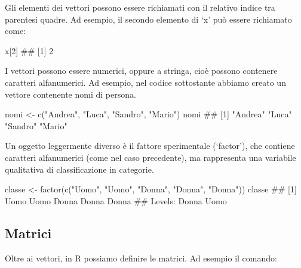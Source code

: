 \documentclass[a4paper,12pt,oneside]{book}
\newenvironment{Shaded}{\begin{snugshade}}{\end{snugshade}}
\newcommand{\DecValTok}[1]{#1}
\newcommand{\StringTok}[1]{#1}
\newcommand{\DocumentationTok}[1]{#1}
\newcommand{\OtherTok}[1]{#1}
\newcommand{\FunctionTok}[1]{#1}
\newcommand{\NormalTok}[1]{#1}
\begin{document}
Gli elementi dei vettori possono essere richiamati con il relativo indice tra parentesi quadre. Ad esempio, il secondo elemento di `x' può essere richiamato come:

\begin{Shaded}
\begin{Highlighting}[]
\NormalTok{x[}\DecValTok{2}\NormalTok{]}
\DocumentationTok{\#\# [1] 2}
\end{Highlighting}
\end{Shaded}

I vettori possono essere numerici, oppure a stringa, cioè possono contenere caratteri alfanumerici. Ad esempio, nel codice sottostante abbiamo creato un vettore contenente nomi di persona.

\begin{Shaded}
\begin{Highlighting}[]
\NormalTok{nomi }\OtherTok{\textless{}{-}} \FunctionTok{c}\NormalTok{(}\StringTok{"Andrea"}\NormalTok{, }\StringTok{"Luca"}\NormalTok{, }\StringTok{"Sandro"}\NormalTok{, }\StringTok{"Mario"}\NormalTok{)}
\NormalTok{nomi}
\DocumentationTok{\#\# [1] "Andrea" "Luca"   "Sandro" "Mario"}
\end{Highlighting}
\end{Shaded}

Un oggetto leggermente diverso è il fattore sperimentale (`factor'), che contiene caratteri alfanumerici (come nel caso precedente), ma rappresenta una variabile qualitativa di classificazione in categorie.

\begin{Shaded}
\begin{Highlighting}[]
\NormalTok{classe }\OtherTok{\textless{}{-}} \FunctionTok{factor}\NormalTok{(}\FunctionTok{c}\NormalTok{(}\StringTok{"Uomo"}\NormalTok{, }\StringTok{"Uomo"}\NormalTok{, }\StringTok{"Donna"}\NormalTok{, }\StringTok{"Donna"}\NormalTok{, }\StringTok{"Donna"}\NormalTok{))}
\NormalTok{classe}
\DocumentationTok{\#\# [1] Uomo  Uomo  Donna Donna Donna}
\DocumentationTok{\#\# Levels: Donna Uomo}
\end{Highlighting}
\end{Shaded}

\hypertarget{matrici}{%
\subsection*{Matrici}\label{matrici}}

Oltre ai vettori, in R possiamo definire le matrici. Ad esempio il comando:
\end{document}

